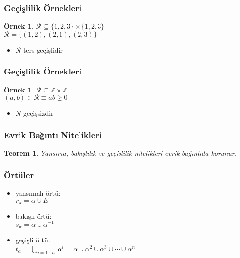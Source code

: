 \documentclass[dvipsnames]{beamer}
\theoremstyle{definition}
\theoremstyle{example}
\newtheorem{ornek}[theorem]{Örnek}
\theoremstyle{plain}
\newtheorem{teorem}[theorem]{Teorem}
\begin{document}
\begin{frame}
  \frametitle{Geçişlilik Örnekleri}

  \begin{ornek}
    $\mathcal{R} \subseteq \{1,2,3\} \times \{1,2,3\}$\\
    $\mathcal{R} = \{(1,2), (2,1), (2,3)\}$

    \medskip
    \begin{itemize}
      \item $\mathcal{R}$ ters geçişlidir
    \end{itemize}
  \end{ornek}
\end{frame}

\begin{frame}
  \frametitle{Geçişlilik Örnekleri}

  \begin{ornek}
    $\mathcal{R} \subseteq \mathbb{Z} \times \mathbb{Z}$\\
    $(a,b) \in \mathcal{R} \equiv ab \geq 0$

    \medskip
    \begin{itemize}
      \item $\mathcal{R}$ geçişsizdir
    \end{itemize}
  \end{ornek}
\end{frame}

\begin{frame}
  \frametitle{Evrik Bağıntı Nitelikleri}

  \begin{teorem}
    Yansıma, bakışlılık ve geçişlilik nitelikleri evrik bağıntıda korunur.
  \end{teorem}
\end{frame}

\begin{frame}
  \frametitle{Örtüler}

  \begin{itemize}
    \item yansımalı örtü:\\
      $r_{\alpha} = \alpha \cup E$

    \pause
    \medskip
    \item bakışlı örtü:\\
      $s_{\alpha} = \alpha \cup \alpha^{-1}$

    \pause
    \medskip
    \item geçişli örtü:\\
      $t_{\alpha} = \bigcup_{i=1 \dots n}~\alpha^i
        = \alpha \cup \alpha^2 \cup \alpha^3 \cup \cdots \cup \alpha^n$
  \end{itemize}
\end{frame}
\end{document}
